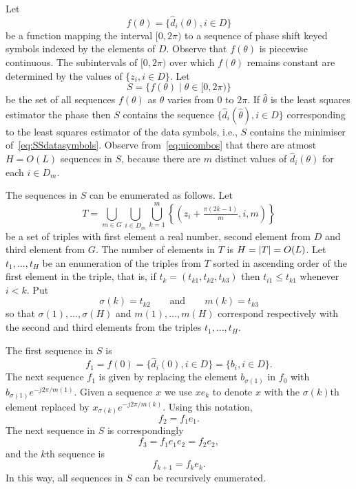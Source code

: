 \documentclass[journal]{IEEEtran}
\begin{document}
Let 
\[
f(\theta) = \{ \hat{d}_i(\theta), i \in D \}
\]
be a function mapping the interval $[0, 2\pi)$ to a sequence of phase shift keyed symbols indexed by the elements of $D$.  Observe that $f(\theta)$ is piecewise continuous.  The subintervals of $[0, 2\pi)$ over which $f(\theta)$ remains constant are determined by the values of $\{z_i, i \in D\}$.  Let
\[
S = \{ f(\theta) \mid \theta \in [0, 2 \pi) \}
\]
be the set of all sequences $f(\theta)$ as $\theta$ varies from $0$ to $2\pi$.  If $\hat{\theta}$ is the least squares estimator the phase then $S$ contains the sequence $\{ \hat{d}_i(\hat{\theta}), i \in D \}$ corresponding to the least squares estimator of the data symbols, i.e., $S$ contains the minimiser of~\eqref{eq:SSdatasymbols}.  Observe from~\eqref{eq:uicombos} that there are atmost $H = O(L)$ sequences in $S$, because there are $m$ distinct values of $\hat{d}_i(\theta)$ for each $i \in D_m$.

The sequences in $S$ can be enumerated as follows.  Let 
\[
T = \bigcup_{m\in G} \bigcup_{ i \in D_m }\bigcup_{k=1}^{m}\left\{ (z_i + \tfrac{\pi(2k - 1)}{m}, i, m) \right\}
\]
be a set of triples with first element a real number, second element from $D$ and third element from $G$.  The number of elements in $T$ is $H = {\left\vert T \right\vert} = O(L)$.  Let $t_1,\dots,t_H$ be an enumeration of the triples from $T$ sorted in ascending order of the first element in the triple, that is, if $t_{k} = (t_{k1},t_{k2},t_{k3})$ then $t_{i1} \leq t_{k1}$ whenever $i < k$.  Put 
\[
\sigma(k) = t_{k2} \qquad \text{and} \qquad m(k) = t_{k3}
\]
so that $\sigma(1), \dots, \sigma(H)$ and $m(1),\dots,m(H)$ correspond respectively with the second and third elements from the triples $t_1,\dots,t_H$.

The first sequence in $S$ is 
\[
f_1 = f(0) = \{ \hat{d}_i(0), i \in D \} = \{ b_i, i \in D \}.
\]  
The next sequence $f_1$ is given by replacing the element $b_{\sigma(1)}$ in $f_0$ with $b_{\sigma(1)}e^{-j2\pi/m(1)}$.  Given a sequence $x$ we use $x e_{k}$ to denote $x$ with the $\sigma(k)$th element replaced by $x_{\sigma(k)} e^{-j2\pi/m(k)}$.  Using this notation,  
\[
f_2 = f_1 e_1.
\] 
The next sequence in $S$ is correspondingly 
\[
f_3 = f_1 e_{1} e_{2} = f_2 e_{2},
\]
and the $k$th sequence is
\begin{equation}\label{eq:fkrec}
f_{k+1} = f_{k} e_{k}.
\end{equation}
In this way, all sequences in $S$ can be recursively enumerated.
\end{document}
